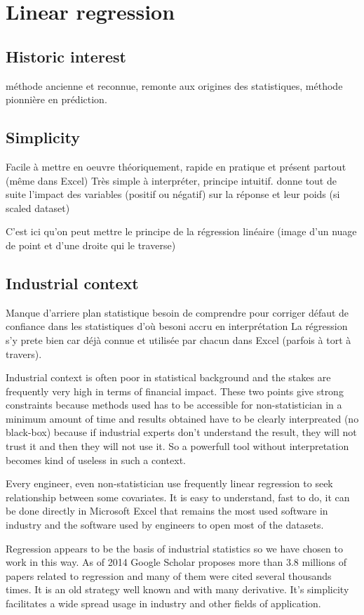 \documentclass[12pt,a4paper]{report}
\begin{document}
	\section{Linear regression}
		\subsection{Historic interest}
			méthode ancienne et reconnue, remonte aux origines des statistiques, méthode pionnière en prédiction.
		\subsection{Simplicity}
			Facile à mettre en oeuvre théoriquement, rapide en pratique et présent partout (même dans Excel)
			Très simple à interpréter, principe intuitif.
			donne tout de suite l'impact des variables (positif ou négatif) sur la réponse et leur poids (si scaled dataset) 
			
			C'est ici qu'on peut mettre le principe de la régression linéaire (image d'un nuage de point et d'une droite qui le traverse)
		\subsection{Industrial context}
			Manque d'arriere plan statistique
			besoin de comprendre pour corriger
			défaut de confiance dans les statistiques d'où besoni accru en interprétation
			La régression s'y prete bien car déjà connue et utilisée par chacun dans Excel (parfois à tort à travers).
			
			
			Industrial context is often poor in statistical background and the stakes are frequently very high in terms of financial impact. 
		These two points give strong constraints because methods used has to be accessible for non-statistician in a minimum amount of time and results obtained have to be clearly interpreated (no black-box) because if industrial experts don't understand the result, they will not trust it and then they will not use it. So a powerfull tool without interpretation becomes kind of useless in such a context.
		
		Every engineer, even non-statistician use frequently linear regression to seek relationship between some covariates. It is easy to understand, fast to do, it can be done directly in Microsoft Excel that remains the most used software in industry and the software used by engineers to open most of the datasets.
		 
		 Regression appears to be the basis of industrial statistics so we have chosen to work in this way. As of 2014 Google Scholar proposes more than $3.8$ millions of papers related to regression and many of them were cited several thousands times. It is an old strategy well known and with many derivative. 
		 It's simplicity facilitates a wide spread usage in industry and other fields of application.
			
\end{document}

